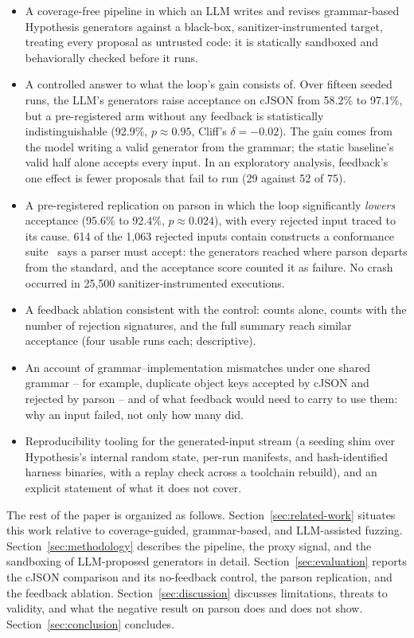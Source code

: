 \begin{itemize}
  \item A coverage-free pipeline in which an LLM writes and revises
    grammar-based Hypothesis generators against a black-box,
    sanitizer-instrumented target, treating every proposal as untrusted
    code: it is statically sandboxed and behaviorally checked before it
    runs.
  \item A controlled answer to what the loop's gain consists of. Over
    fifteen seeded runs, the LLM's generators raise acceptance on cJSON from
    58.2\% to 97.1\%, but a pre-registered arm without any feedback is
    statistically indistinguishable (92.9\%, $p \approx 0.95$, Cliff's
    $\delta = -0.02$). The gain comes from the model writing a valid
    generator from the grammar; the static baseline's valid half alone
    accepts every input. In an exploratory analysis, feedback's one effect
    is fewer proposals that fail to run (29 against 52 of 75).
  \item A pre-registered replication on parson in which the loop
    significantly \emph{lowers} acceptance (95.6\% to 92.4\%,
    $p \approx 0.024$), with every rejected input traced to its cause. 614
    of the 1{,}063 rejected inputs contain constructs a conformance
    suite~\cite{seriot2016jsontestsuite} says a parser must accept: the
    generators reached where parson departs from the standard, and the
    acceptance score counted it as failure. No crash occurred in 25{,}500
    sanitizer-instrumented executions.
  \item A feedback ablation consistent with the control: counts alone,
    counts with the number of rejection signatures, and the full summary
    reach similar acceptance (four usable runs each; descriptive).
  \item An account of grammar--implementation mismatches under one shared
    grammar -- for example, duplicate object keys accepted by cJSON and
    rejected by parson -- and of what feedback would need to carry to use
    them: why an input failed, not only how many did.
  \item Reproducibility tooling for the generated-input stream (a seeding
    shim over Hypothesis's internal random state, per-run manifests, and
    hash-identified harness binaries, with a replay check across a
    toolchain rebuild), and an explicit statement of what it does not
    cover.
\end{itemize}

The rest of the paper is organized as follows. Section~\ref{sec:related-work}
situates this work relative to coverage-guided, grammar-based, and
LLM-assisted fuzzing. Section~\ref{sec:methodology} describes the pipeline,
the proxy signal, and the sandboxing of LLM-proposed generators in detail.
Section~\ref{sec:evaluation} reports the cJSON comparison and its
no-feedback control, the parson replication, and the feedback ablation. Section~\ref{sec:discussion} discusses limitations, threats to
validity, and what the negative result on parson does and does not show.
Section~\ref{sec:conclusion} concludes.
